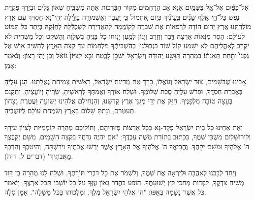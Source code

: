 \documentclass[twoside, openany, parskip=half, 11pt]{book}
\begin{document}
 

אֶל־כַּפָּ֔יִם אֶל־אֵ֖ל בַּשָּׁמָֽיִם׃ אָנָּא אָב הָרַחֲמִים מְקוֹר הַבְּֿרָכוֹת אַתָּה מַשְׁבִּֽיחַ שְׁאוֹן גַּלִּים וּבְיָדְךָ פְּקֻדַּת נֶ֣פֶשׁ כָּל־חָ֑י אֶ֢לֶף שָׁנִ֡ים בְּֽעֵינֶ֗יךָ כְּי֣וֹם אֶ֭תְמוֹל כִּ֣י יַֽעֲבֹ֑ר וְאַשְׁמוּרָ֥ה בַלָּֽיְלָה׃ יְהִי־נָא חַסְדְּֿךָ עִם אֶֽרֶץ מוֹלַדְּתֵּֽנוּ אֶֽרֶץ
 יָרוּם הוֹדָהּ לְרַפּאוֹת אֶת שִׁבְרָהּ לְקוֹמֲמָהּ לְהַאֲדִירָהּ לְשַׁכְלְֿלָהּ לְחַזְּֿקָהּ בְּיָתֵד בַּל תִּמּוֹט לְעוֹלָם: הָסֵר מִנְּֿאוֹת אַרְצָהּ דֶּֽבֶר וְחֶֽרֶב וְיָגוֹן לְמַֽעַן יָנֽוּחוּ כָל בָּנֶֽיהָ בְּשַׁלְוָה וְהַשְׁקֵט וְכָל מַשְׁחִית לֹא יִקְרַב לְאָהֳלֵיהֶם לֹא יִשָּׁמַע קוֹל שׁוֹד בִּגְבוּלֵֽנוּ: בְּהַשְׁבִּיתְֿךָ מִלְחָמוֹת עַד קְצֵה הָאָֽרֶץ לְהָשִׁיב אִישׁ אֶל  גַּפְנוֹ֙ וְתַ֣חַת תְּאֵֽנָת֔וֹ׃ בִּמְהֵרָה תִּוָּשַׁ֣ע יְהוּדָ֔ה וְיִשְׂרָאֵ֖ל יִשְׁכֹּ֣ן לָבֶ֑טַח וּבָ֤א לְצִיּוֹן֙ גּוֹאֵ֔ל וְכֵן יְהִי רָצוֹן: וְנֹאמַר אָמֵן:



    אָבִינוּ שֶׁבַּשָּׁמַיִם, צוּר יִשְׂרָאֵל וְגוֹאֲלוֹ, בָּרֵךְ אֶת מְדִינַת יִשְׂרָאֵל, רֵאשִׁית צְמִיחַת גְּאֻלָּתֵנוּ. הָגֵן עָלֶיהָ בְּאֶבְרַת חַסְדֶּךָ, וּפְרֹשׁ עָלֶיהָ סֻכַּת שְׁלוֹמֶךָ, וּשְׁלַח אוֹרְךָ וַאֲמִתְּךָ לְרָאשֶׁיהָ, שָׂרֶיהָ וְיוֹעֲצֶיהָ, וְתַקְּנֵם בְּעֵצָה טוֹבָה מִלְּפָנֶיךָ. חַזֵּק אֶת יְדֵי מְגִנֵּי אֶרֶץ קָדְשֵׁנוּ, וְהַנְחִילֵם אֱלֹהֵינוּ יְשׁוּעָה וַעֲטֶרֶת נִצָּחוֹן תְּעַטְּרֵם, וְנָתַתָּ שָׁלוֹם בָּאָרֶץ וְשִׂמְחַת עוֹלָם לְיוֹשְׁבֶיהָ.

    וְאֶת אַחֵינוּ כָּל בֵּית יִשְׂרָאֵל פְּקָד-נָא בְּכָל אַרְצוֹת פְּזוּרֵיהֶם, וְתוֹלִיכֵם מְהֵרָה קוֹמְמִיּוּת לְצִיּוֹן עִירֶךָ וְלִירוּשָׁלַיִם מִשְׁכַּן שְׁמֶךָ, כַּכָּתוּב בְּתוֹרַת משֶׁה עַבְדֶּךָ: "אִם יִהְיֶה נִדַּחֲךָ בִּקְצֵה הַשָּׁמַיִם, מִשָּׁם יְקַבֶּצְךָ ה' אֱלֹהֶיךָ וּמִשָּׁם יִקָּחֶךָ. וֶהֱבִיאֲךָ ה' אֱלֹהֶיךָ אֶל הָאָרֶץ אֲשֶׁר יָרְשׁוּ אֲבֹתֶיךָ וִירִשְׁתָּהּ, וְהֵיטִבְךָ וְהִרְבְּךָ מֵאֲבֹתֶיךָ" (דברים ל, ד-ה).

    וְיַחֵד לְבָבֵנוּ לְאַהֲבָה וּלְיִרְאָה אֶת שְׁמֶךָ, וְלִשְׁמֹר אֶת כָּל דִּבְרֵי תּוֹרָתֶךָ. וּשְׁלַח לָנוּ מְהֵרָה בֶּן דָּוִד מְשִׁיחַ צִדְקֶךָ, לִפְדּות מְחַכֵּי קֵץ יְשׁוּעָתֶךָ. הוֹפַע בַּהֲדַר גְּאוֹן עֻזֶּךָ עַל כָּל יוֹשְׁבֵי תֵּבֵל אַרְצֶךָ, וְיֹאמַר כֹּל אֲשֶׁר נְשָׁמָה בְּאַפּוֹ: "ה' אֱלֹהֵי יִשְׂרָאֵל מֶלֶךְ, וּמַלְכוּתו בַּכּל מָשָׁלָה". אָמֵן סֶלָה.

\end{document}
